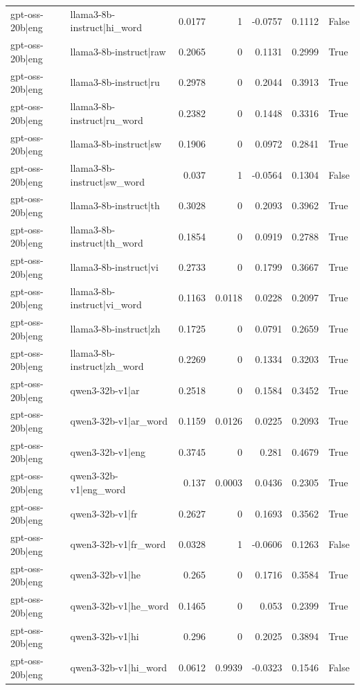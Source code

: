 \begin{table}
\begin{tabular}{l l r r r r l}
gpt-oss-20b|eng & llama3-8b-instruct|hi_word & 0.0177 & 1 & -0.0757 & 0.1112 & False \\
gpt-oss-20b|eng & llama3-8b-instruct|raw & 0.2065 & 0 & 0.1131 & 0.2999 & True \\
gpt-oss-20b|eng & llama3-8b-instruct|ru & 0.2978 & 0 & 0.2044 & 0.3913 & True \\
gpt-oss-20b|eng & llama3-8b-instruct|ru_word & 0.2382 & 0 & 0.1448 & 0.3316 & True \\
gpt-oss-20b|eng & llama3-8b-instruct|sw & 0.1906 & 0 & 0.0972 & 0.2841 & True \\
gpt-oss-20b|eng & llama3-8b-instruct|sw_word & 0.037 & 1 & -0.0564 & 0.1304 & False \\
gpt-oss-20b|eng & llama3-8b-instruct|th & 0.3028 & 0 & 0.2093 & 0.3962 & True \\
gpt-oss-20b|eng & llama3-8b-instruct|th_word & 0.1854 & 0 & 0.0919 & 0.2788 & True \\
gpt-oss-20b|eng & llama3-8b-instruct|vi & 0.2733 & 0 & 0.1799 & 0.3667 & True \\
gpt-oss-20b|eng & llama3-8b-instruct|vi_word & 0.1163 & 0.0118 & 0.0228 & 0.2097 & True \\
gpt-oss-20b|eng & llama3-8b-instruct|zh & 0.1725 & 0 & 0.0791 & 0.2659 & True \\
gpt-oss-20b|eng & llama3-8b-instruct|zh_word & 0.2269 & 0 & 0.1334 & 0.3203 & True \\
gpt-oss-20b|eng & qwen3-32b-v1|ar & 0.2518 & 0 & 0.1584 & 0.3452 & True \\
gpt-oss-20b|eng & qwen3-32b-v1|ar_word & 0.1159 & 0.0126 & 0.0225 & 0.2093 & True \\
gpt-oss-20b|eng & qwen3-32b-v1|eng & 0.3745 & 0 & 0.281 & 0.4679 & True \\
gpt-oss-20b|eng & qwen3-32b-v1|eng_word & 0.137 & 0.0003 & 0.0436 & 0.2305 & True \\
gpt-oss-20b|eng & qwen3-32b-v1|fr & 0.2627 & 0 & 0.1693 & 0.3562 & True \\
gpt-oss-20b|eng & qwen3-32b-v1|fr_word & 0.0328 & 1 & -0.0606 & 0.1263 & False \\
gpt-oss-20b|eng & qwen3-32b-v1|he & 0.265 & 0 & 0.1716 & 0.3584 & True \\
gpt-oss-20b|eng & qwen3-32b-v1|he_word & 0.1465 & 0 & 0.053 & 0.2399 & True \\
gpt-oss-20b|eng & qwen3-32b-v1|hi & 0.296 & 0 & 0.2025 & 0.3894 & True \\
gpt-oss-20b|eng & qwen3-32b-v1|hi_word & 0.0612 & 0.9939 & -0.0323 & 0.1546 & False \\

\end{tabular}
\end{table}
